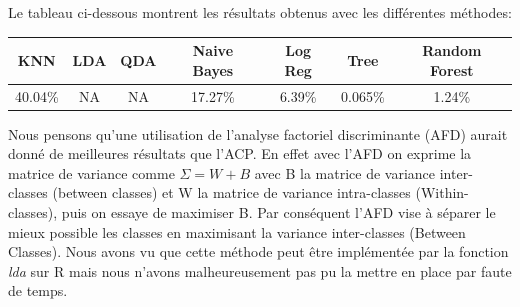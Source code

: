 \documentclass[10pt]{article}
\begin{document}
Le tableau ci-dessous montrent les résultats obtenus avec les différentes méthodes:
\begin{center}
	\begin{tabular}{c |c | c | c| c| c| c|}
		\hline
		KNN & LDA & QDA & Naive Bayes & Log Reg & Tree & Random Forest\\
		\hline	
		40.04\% & NA &  NA &17.27\% & 6.39\% &  0.065\%& 1.24\%
	\end{tabular}
\end{center}

Nous pensons qu'une utilisation de l'analyse factoriel discriminante (AFD) aurait donné de meilleures résultats que l'ACP. En effet avec l'AFD on exprime la matrice de variance comme $\Sigma = W + B$ avec B la matrice de variance inter-classes (between classes) et W la matrice de variance intra-classes (Within-classes), puis on essaye de maximiser B. Par conséquent l'AFD vise à séparer le mieux possible les classes en maximisant la variance inter-classes (Between Classes). Nous avons vu que cette méthode peut être implémentée par la fonction \textit{lda} sur R mais nous n'avons malheureusement pas pu la mettre en place par faute de temps. 
\end{document}
